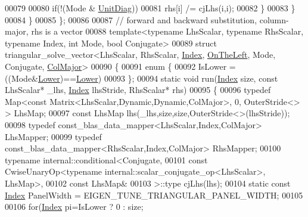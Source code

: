 \begin{DoxyCode}
00079 
00080         \textcolor{keywordflow}{if}(!(Mode & \hyperlink{group__enums_gga39e3366ff5554d731e7dc8bb642f83cdaddb72f888ac85d5a1c52333e54f9374b}{UnitDiag}))
00081           rhs[i] /= cjLhs(i,i);
00082       \}
00083     \}
00084   \}
00085 \};
00086 
00087 \textcolor{comment}{// forward and backward substitution, column-major, rhs is a vector}
00088 \textcolor{keyword}{template}<\textcolor{keyword}{typename} LhsScalar, \textcolor{keyword}{typename} RhsScalar, \textcolor{keyword}{typename} Index, \textcolor{keywordtype}{int} Mode, \textcolor{keywordtype}{bool} Conjugate>
00089 \textcolor{keyword}{struct }triangular\_solve\_vector<LhsScalar, RhsScalar, \hyperlink{namespace_eigen_a62e77e0933482dafde8fe197d9a2cfde}{Index}, \hyperlink{group__enums_ggac22de43beeac7a78b384f99bed5cee0ba129609b3bdf23b071f5f86cf2f995ec4}{OnTheLeft}, Mode, Conjugate, 
      \hyperlink{group__enums_ggaacded1a18ae58b0f554751f6cdf9eb13a0cbd4bdd0abcfc0224c5fcb5e4f6669a}{ColMajor}>
00090 \{
00091   \textcolor{keyword}{enum} \{
00092     IsLower = ((Mode&\hyperlink{group__enums_gga39e3366ff5554d731e7dc8bb642f83cda891792b8ed394f7607ab16dd716f60e6}{Lower})==\hyperlink{group__enums_gga39e3366ff5554d731e7dc8bb642f83cda891792b8ed394f7607ab16dd716f60e6}{Lower})
00093   \};
00094   \textcolor{keyword}{static} \textcolor{keywordtype}{void} run(\hyperlink{namespace_eigen_a62e77e0933482dafde8fe197d9a2cfde}{Index} size, \textcolor{keyword}{const} LhsScalar* \_lhs, \hyperlink{namespace_eigen_a62e77e0933482dafde8fe197d9a2cfde}{Index} lhsStride, RhsScalar* rhs)
00095   \{
00096     \textcolor{keyword}{typedef} Map<const Matrix<LhsScalar,Dynamic,Dynamic,ColMajor>, 0, OuterStride<> > LhsMap;
00097     \textcolor{keyword}{const} LhsMap lhs(\_lhs,size,size,OuterStride<>(lhsStride));
00098     \textcolor{keyword}{typedef} const\_blas\_data\_mapper<LhsScalar,Index,ColMajor> LhsMapper;
00099     \textcolor{keyword}{typedef} const\_blas\_data\_mapper<RhsScalar,Index,ColMajor> RhsMapper;
00100     \textcolor{keyword}{typename} internal::conditional<Conjugate,
00101                                    \textcolor{keyword}{const} CwiseUnaryOp<typename internal::scalar\_conjugate\_op<LhsScalar>,
      LhsMap>,
00102                                    \textcolor{keyword}{const} LhsMap&
00103                                   >::type cjLhs(lhs);
00104     \textcolor{keyword}{static} \textcolor{keyword}{const} \hyperlink{namespace_eigen_a62e77e0933482dafde8fe197d9a2cfde}{Index} PanelWidth = EIGEN\_TUNE\_TRIANGULAR\_PANEL\_WIDTH;
00105 
00106     \textcolor{keywordflow}{for}(\hyperlink{namespace_eigen_a62e77e0933482dafde8fe197d9a2cfde}{Index} pi=IsLower ? 0 : size;

\end{DoxyCode}
